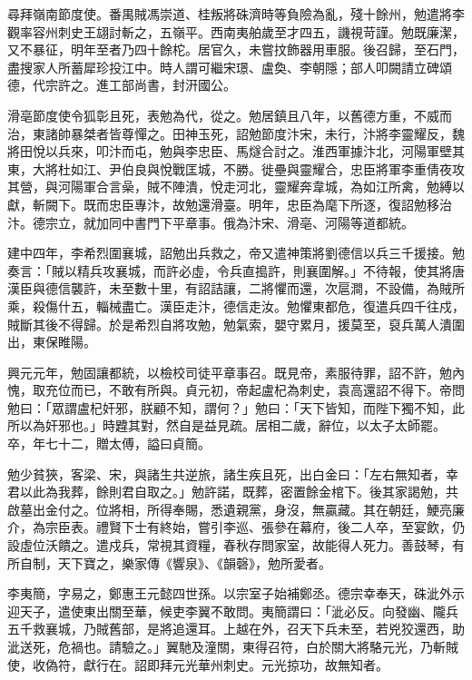 \begin{pinyinscope}
 尋拜嶺南節度使。番禺賊馮崇道、桂叛將硃濟時等負險為亂，殘十餘州，勉遣將李觀率容州刺史王翃討斬之，五嶺平。西南夷舶歲至才四五，譏視苛謹。勉既廉潔，又不暴征，明年至者乃四十餘柁。居官久，未嘗抆飾器用車服。後召歸，至石門，盡搜家人所蓄犀珍投江中。時人謂可繼宋璟、盧奐、李朝隱；部人叩闕請立碑頌德，代宗許之。進工部尚書，封汧國公。



 滑亳節度使令狐彰且死，表勉為代，從之。勉居鎮且八年，以舊德方重，不威而治，東諸帥暴桀者皆尊憚之。田神玉死，詔勉節度汴宋，未行，汴將李靈耀反，魏將田悅以兵來，叩汴而屯，勉與李忠臣、馬燧合討之。淮西軍據汴北，河陽軍壁其東，大將杜如江、尹伯良與悅戰匡城，不勝。徙壘與靈耀合，忠臣將軍李重倩夜攻其營，與河陽軍合言喿，賊不陣潰，悅走河北，靈耀奔韋城，為如江所禽，勉縛以獻，斬闕下。既而忠臣專汴，故勉還滑臺。明年，忠臣為麾下所逐，復詔勉移治汴。德宗立，就加同中書門下平章事。俄為汴宋、滑亳、河陽等道都統。



 建中四年，李希烈圍襄城，詔勉出兵救之，帝又遣神策將劉德信以兵三千援接。勉奏言：「賊以精兵攻襄城，而許必虛，令兵直搗許，則襄圍解。」不待報，使其將唐漢臣與德信襲許，未至數十里，有詔詰讓，二將懼而還，次扈澗，不設備，為賊所乘，殺傷什五，輜械盡亡。漢臣走汴，德信走汝。勉懼東都危，復遣兵四千往戍，賊斷其後不得歸。於是希烈自將攻勉，勉氣索，嬰守累月，援莫至，裒兵萬人潰圍出，東保睢陽。



 興元元年，勉固讓都統，以檢校司徒平章事召。既見帝，素服待罪，詔不許，勉內愧，取充位而已，不敢有所與。貞元初，帝起盧杞為刺史，袁高還詔不得下。帝問勉曰：「眾謂盧杞奸邪，朕顧不知，謂何？」勉曰：「天下皆知，而陛下獨不知，此所以為奸邪也。」時韙其對，然自是益見疏。居相二歲，辭位，以太子太師罷。卒，年七十二，贈太傅，謚曰貞簡。



 勉少貧狹，客梁、宋，與諸生共逆旅，諸生疾且死，出白金曰：「左右無知者，幸君以此為我葬，餘則君自取之。」勉許諾，既葬，密置餘金棺下。後其家謁勉，共啟墓出金付之。位將相，所得奉賜，悉遺親黨，身沒，無贏藏。其在朝廷，鯁亮廉介，為宗臣表。禮賢下士有終始，嘗引李巡、張參在幕府，後二人卒，至宴飲，仍設虛位沃饋之。遣戍兵，常視其資糧，春秋存問家室，故能得人死力。善鼓琴，有所自制，天下寶之，樂家傳《響泉》、《韻磬》，勉所愛者。



 李夷簡，字易之，鄭惠王元懿四世孫。以宗室子始補鄭丞。德宗幸奉天，硃泚外示迎天子，遣使東出關至華，候吏李翼不敢問。夷簡謂曰：「泚必反。向發幽、隴兵五千救襄城，乃賊舊部，是將追還耳。上越在外，召天下兵未至，若兇狡還西，助泚送死，危禍也。請驗之。」翼馳及潼關，東得召符，白於關大將駱元光，乃斬賊使，收偽符，獻行在。詔即拜元光華州刺史。元光掠功，故無知者。




\end{pinyinscope}
